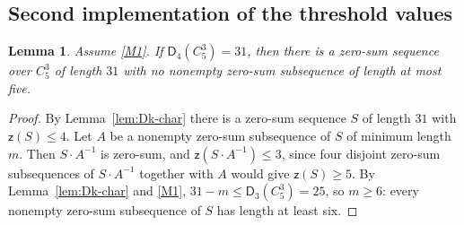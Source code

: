\documentclass[10pt,a4paper]{amsart}
\newtheorem{lemma}{Lemma}
\newcommand{\C}{C_5^{3}}
\newcommand{\Dk}{\mathsf{D}}
\newcommand{\zz}{\mathsf{z}}
\begin{document}
\subsection{Second implementation of the threshold values}\label{subsec:thresholds}

\begin{lemma}\label{lem:reduction}
Assume \ref{M1}. If $\Dk_4(\C)=31$, then there is a zero-sum sequence over $\C$ of length $31$ with no nonempty zero-sum subsequence of length at most five.
\end{lemma}

\begin{proof}
By Lemma~\ref{lem:Dk-char} there is a zero-sum sequence $S$ of length $31$ with $\zz(S)\le4$. Let $A$ be a nonempty zero-sum subsequence of $S$ of minimum length $m$. Then $S\cdot A^{-1}$ is zero-sum, and $\zz(S\cdot A^{-1})\le3$, since four disjoint zero-sum subsequences of $S\cdot A^{-1}$ together with $A$ would give $\zz(S)\ge5$. By Lemma~\ref{lem:Dk-char} and \ref{M1}, $31-m\le\Dk_3(\C)=25$, so $m\ge6$: every nonempty zero-sum subsequence of $S$ has length at least six.
\end{proof}
\end{document}
